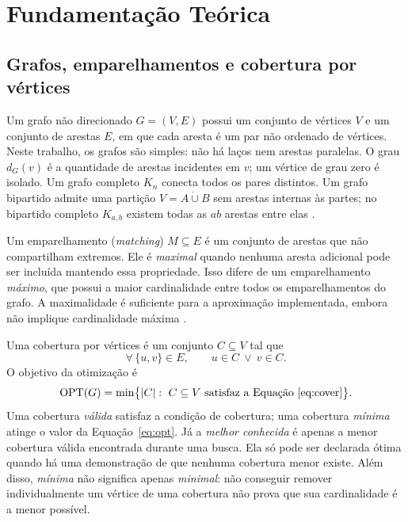 \section{Fundamentação Teórica}
\label{sec:theory}

\subsection{Grafos, emparelhamentos e cobertura por vértices}

Um grafo não direcionado $G=(V,E)$ possui um conjunto de vértices $V$ e um
conjunto de arestas $E$, em que cada aresta é um par não ordenado de
vértices. Neste trabalho, os grafos são simples: não há laços nem arestas
paralelas. O grau $d_G(v)$ é a quantidade de arestas incidentes em $v$;
um vértice de grau zero é isolado. Um grafo completo $K_n$ conecta todos
os pares distintos. Um grafo bipartido admite uma partição
$V=A\mathbin{\dot\cup}B$ sem arestas internas às partes; no bipartido
completo $K_{a,b}$ existem todas as $ab$ arestas entre elas
\cite{cormen2022}.

Um emparelhamento (\emph{matching}) $M\subseteq E$ é um conjunto de arestas
que não compartilham extremos. Ele é \emph{maximal} quando nenhuma aresta
adicional pode ser incluída mantendo essa propriedade. Isso difere de
um emparelhamento \emph{máximo}, que possui a maior cardinalidade entre
todos os emparelhamentos do grafo. A maximalidade é suficiente para a
aproximação implementada, embora não implique cardinalidade máxima
\cite{vazirani2001}.

Uma cobertura por vértices é um conjunto $C\subseteq V$ tal que
\begin{equation}
  \forall\,\{u,v\}\in E,\qquad u\in C\ \lor\ v\in C .
  \label{eq:cover}
\end{equation}
O objetivo da otimização é
\begin{equation}
  \OPT(G)=\min\bigl\{|C|:\ C\subseteq V
       \text{ satisfaz a Equação~\eqref{eq:cover}}\bigr\}.
  \label{eq:opt}
\end{equation}
Uma cobertura \emph{válida} satisfaz a condição de cobertura; uma cobertura
\emph{mínima} atinge o valor da Equação~\eqref{eq:opt}.
Já a \emph{melhor conhecida} é apenas a
menor cobertura válida encontrada durante uma busca. Ela só pode ser
declarada ótima quando há uma demonstração de que nenhuma cobertura menor
existe. Além disso, \emph{mínima} não significa apenas \emph{minimal}:
não conseguir remover individualmente um vértice de uma cobertura não
prova que sua cardinalidade é a menor possível.

